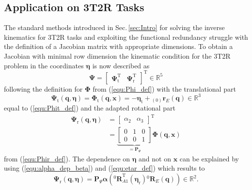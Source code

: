 \documentclass{svproc}
\newcommand{\bm}[1]{\boldsymbol{#1}}
\newcommand{\ortvek}[4]{{ }_{(#1)}{\boldsymbol{#2}}^{#3}_{#4} }
\newcommand{\rotmat}[2]{{{ }^{#1}\boldsymbol{R}}_{#2}}
\newcommand{\transp}[0]{{\mathrm{T}}}
\begin{document}
\subsection{Application on 3T2R Tasks}
\label{sec:RecEulAng_3T2R_app}

The standard methods introduced in Sec.\,\ref{sec:Intro} for solving the inverse kinematics for 3T2R tasks and exploiting the functional redundancy struggle with the definition of a Jacobian matrix with appropriate dimensions.
To obtain a Jacobian with minimal row dimension the kinematic condition for the 3T2R problem in the coordinates $\bm{\eta}$ is now described as
%
\begin{equation}
\bm{\Psi}=\begin{bmatrix}
\bm{\Psi}_{\mathrm{t}}^\transp & \bm{\Psi}_{\mathrm{r}}^\transp
\end{bmatrix}^\transp \in {\mathbb{R}}^{5}
\end{equation}
%
following the definition for $\bm{\Phi}$ from (\ref{equ:Phi_def}) with the translational part
%
\begin{equation}
\bm{\Psi}_{\mathrm{t}}(\bm{q},\bm{\eta}) 
= 
\bm{\Phi}_{\mathrm{t}}(\bm{q},\bm{x}) 
=
- \bm{\eta}_{\mathrm{t}} + \ortvek{0}{r}{}{E}(\bm{q}) \in {\mathbb{R}}^{3}
\end{equation}
%
equal to (\ref{equ:Phit_def}) and the adapted rotational part
%
\begin{align}
\bm{\Psi}_{\mathrm{r}}(\bm{q},\bm{\eta}) &= 
\begin{bmatrix}
\alpha_2  & \alpha_3
\end{bmatrix}^\transp \nonumber \\
&=
\underbrace{\begin{bmatrix}
    0 & 1 & 0  \\ 
    0 & 0 & 1
    \end{bmatrix}}_{=\bm{P}_{\Psi}}
 \bm{\Phi} (\bm{q},\bm{x})
\label{equ:Psir_def}
\end{align}
%
from (\ref{equ:Phir_def}). 
The dependence on $\bm{\eta}$ and not on $\bm{x}$ can be explained by using (\ref{equ:alpha_dep_beta}) and (\ref{equ:etar_def}) which results to
%
\begin{equation}
\bm{\Psi}_{\mathrm{r}}(\bm{q},\bm{\eta}) = \bm{P}_{\Psi} \bm{\alpha}\left(\rotmat{0}{A1}^\transp (\bm{\eta}_{\mathrm{r}})\rotmat{0}{E}(\bm{q})\right) \in {\mathbb{R}}^{2}.
\end{equation}
\end{document}
